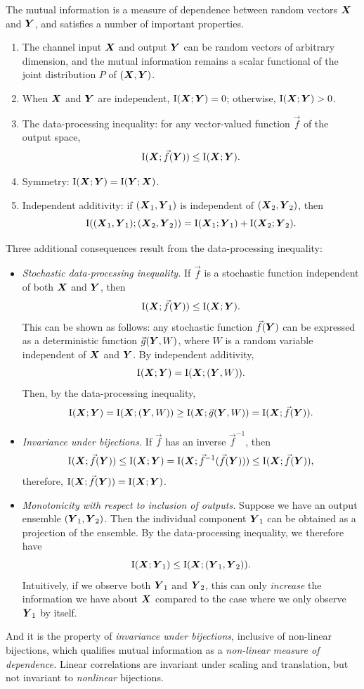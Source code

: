 The mutual information is a measure of dependence between random
vectors $\boldsymbol{X}$ and $\boldsymbol{Y}$, and satisfies a number of important
properties.
\begin{enumerate}
\item The channel input $\boldsymbol{X}$ and output $\boldsymbol{Y}$ can be random vectors of arbitrary dimension, and the mutual information remains a scalar functional of the joint distribution $P$ of $(\boldsymbol{X}, \boldsymbol{Y})$.
\item When $\boldsymbol{X}$ and $\boldsymbol{Y}$ are independent, $\text{I}(\boldsymbol{X}; \boldsymbol{Y}) = 0$; otherwise, $\text{I}(\boldsymbol{X}; \boldsymbol{Y}) > 0$.
\item The data-processing inequality: for any vector-valued function $\vec{f}$ of the output space,
\[
\text{I}(\boldsymbol{X}; \vec{f}(\boldsymbol{Y})) \leq \text{I}(\boldsymbol{X}; \boldsymbol{Y}).
\]
\item Symmetry: $\text{I}(\boldsymbol{X}; \boldsymbol{Y}) = \text{I}(\boldsymbol{Y}; \boldsymbol{X})$.
\item Independent additivity: if $(\boldsymbol{X}_1,\boldsymbol{Y}_1)$ is independent of $(\boldsymbol{X}_2, \boldsymbol{Y}_2)$, then
\[
\text{I}((\boldsymbol{X}_1,\boldsymbol{Y}_1); (\boldsymbol{X}_2, \boldsymbol{Y}_2)) = \text{I}(\boldsymbol{X}_1; \boldsymbol{Y}_1) + \text{I}(\boldsymbol{X}_2; \boldsymbol{Y}_2).
\]
\end{enumerate}
Three additional consequences result from the data-processing inequality:
\begin{itemize}
\item \emph{Stochastic data-processing inequality.}  If $\vec{f}$ is a stochastic function independent of both $\boldsymbol{X}$ and $\boldsymbol{Y}$, then
\[
\text{I}(\boldsymbol{X}; \vec{f}(\boldsymbol{Y})) \leq \text{I}(\boldsymbol{X}; \boldsymbol{Y}).
\]
This can be shown as follows: any stochastic function $\vec{f}(\boldsymbol{Y})$
can be expressed as a deterministic function $\vec{g}(\boldsymbol{Y}, W)$, where
$W$ is a random variable independent of $\boldsymbol{X}$ and $\boldsymbol{Y}$.
By independent additivity,
\[
\text{I}(\boldsymbol{X}; \boldsymbol{Y}) = \text{I}(\boldsymbol{X}; (\boldsymbol{Y}, W)).
\]
Then, by the data-processing inequality,
\[
\text{I}(\boldsymbol{X}; \boldsymbol{Y}) = \text{I}(\boldsymbol{X}; (\boldsymbol{Y}, W)) \geq \text{I}(\boldsymbol{X}; \vec{g}(\boldsymbol{Y}, W)) = \text{I}(\boldsymbol{X}; \vec{f}(\boldsymbol{Y})).
\]
\item \emph{Invariance under bijections.} If $\vec{f}$ has an inverse $\vec{f}^{-1}$, then 
\[
\text{I}(\boldsymbol{X}; \vec{f}(\boldsymbol{Y})) \leq \text{I}(\boldsymbol{X}; \boldsymbol{Y}) = \text{I}(\boldsymbol{X}; \vec{f}^{-1}(\vec{f}(\boldsymbol{Y}))) \leq \text{I}(\boldsymbol{X}; \vec{f}(\boldsymbol{Y})),
\]
therefore, $\text{I}(\boldsymbol{X}; \vec{f}(\boldsymbol{Y})) = \text{I}(\boldsymbol{X}; \boldsymbol{Y})$.
\item \emph{Monotonicity with respect to inclusion of outputs.}  Suppose we have an output ensemble $(\boldsymbol{Y}_1,\boldsymbol{Y}_2)$.  Then the individual component $\boldsymbol{Y}_1$ can be obtained as a projection of the ensemble.  By the data-processing inequality, we therefore have
\[
\text{I}(\boldsymbol{X}; \boldsymbol{Y}_1) \leq \text{I}(\boldsymbol{X}; (\boldsymbol{Y}_1, \boldsymbol{Y}_2)).
\]
Intuitively, if we observe both $\boldsymbol{Y}_1$ and $\boldsymbol{Y}_2$, this can
only \emph{increase} the information we have about $\boldsymbol{X}$ compared to
the case where we only observe $\boldsymbol{Y}_1$ by itself.
\end{itemize}
And it is the property of \emph{invariance under bijections},
inclusive of non-linear bijections, which qualifies mutual information
as a \emph{non-linear measure of dependence.}  Linear correlations are
invariant under scaling and translation, but not invariant
to \emph{nonlinear} bijections.

